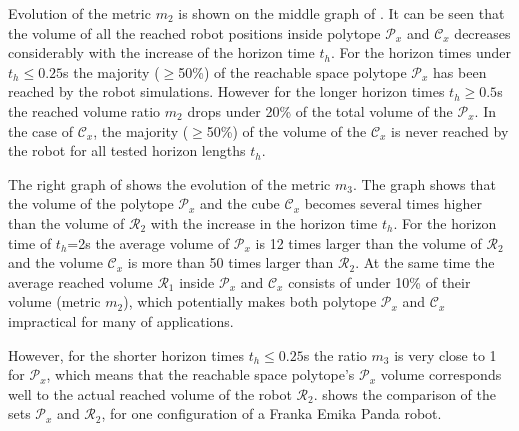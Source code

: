 Evolution of the metric $m_2$ is shown on the middle graph of  . It can be seen that the volume of all the reached robot positions inside polytope $\mathcal{P}_x$ and $\mathcal{C}_x$ decreases considerably with the increase of the horizon time $t_h$. For the horizon times under $t_h\leq 0.25$s the majority ($\geq$50\%) of the reachable space polytope $\mathcal{P}_x$ has been reached by the robot simulations. However for the longer horizon times $t_h\geq0.5$s the reached volume ratio $m_2$ drops under 20\% of the total volume of the $\mathcal{P}_x$. In the case of $\mathcal{C}_x$, the majority ($\geq$50\%)  of the volume of the $\mathcal{C}_x$ is never reached by the robot for all tested horizon lengths $t_h$. 


The right graph of  shows the evolution of the metric $m_3$. The graph shows that the volume of the polytope $\mathcal{P}_x$ and the cube $\mathcal{C}_x$ becomes several times higher than the volume of $\mathcal{R}_2$ with the increase in the horizon time $t_h$. For the horizon time of $t_h$=2s the average volume of $\mathcal{P}_x$ is 12 times larger than the volume of $\mathcal{R}_2$ and the volume $\mathcal{C}_x$ is more than 50 times larger than $\mathcal{R}_2$. At the same time the average reached volume $\mathcal{R}_1$ inside $\mathcal{P}_x$ and $\mathcal{C}_x$ consists of under 10\% of their volume (metric $m_2$), which potentially makes both polytope $\mathcal{P}_x$ and $\mathcal{C}_x$ impractical for many of applications.

However, for the shorter horizon times $t_h\leq0.25$s the ratio $m_3$ is very close to 1 for $\mathcal{P}_x$, which means that the reachable space polytope's $\mathcal{P}_x$ volume corresponds well to the actual reached volume of the robot $\mathcal{R}_2$.   shows the comparison of the sets $\mathcal{P}_x$ and $\mathcal{R}_2$, for one configuration of a Franka Emika Panda robot.



